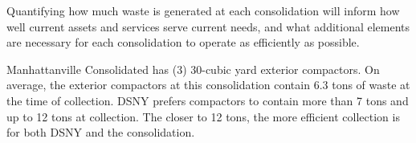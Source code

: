 
    Quantifying how much waste is generated at each consolidation will inform how well current assets and services serve current needs, and what additional elements are necessary for each consolidation to operate as efficiently as possible.
    
    Manhattanville Consolidated has (3) 30-cubic yard exterior compactors. On average, the exterior compactors at this consolidation contain 6.3 tons of waste at the time of collection. DSNY prefers compactors to contain more than 7 tons and up to 12 tons at collection. The closer to 12 tons, the more efficient collection is for both DSNY and the consolidation.